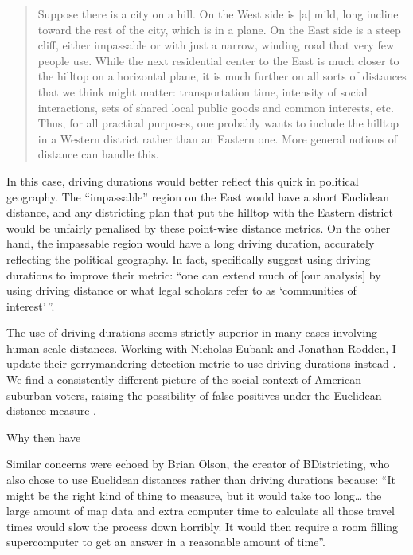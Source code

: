 \documentclass[]{article}
\begin{document}
\begin{quote}
Suppose there is a city on a hill. On the West side is {[}a{]} mild,
long incline toward the rest of the city, which is in a plane. On the
East side is a steep cliff, either impassable or with just a narrow,
winding road that very few people use. While the next residential center
to the East is much closer to the hilltop on a horizontal plane, it is
much further on all sorts of distances that we think might matter:
transportation time, intensity of social interactions, sets of shared
local public goods and common interests, etc. Thus, for all practical
purposes, one probably wants to include the hilltop in a Western
district rather than an Eastern one. More general notions of distance
can handle this.
\end{quote}

In this case, driving durations would better reflect this quirk in
political geography. The ``impassable'' region on the East would have a
short Euclidean distance, and any districting plan that put the hilltop
with the Eastern district would be unfairly penalised by these
point-wise distance metrics. On the other hand, the impassable region
would have a long driving duration, accurately reflecting the political
geography. In fact, \citeauthor{fh2011} specifically suggest using
driving durations to improve their metric: ``one can extend much of
{[}our analysis{]} by using driving distance or what legal scholars
refer to as `communities of interest'\,''.

The use of driving durations seems strictly superior in many cases
involving human-scale distances. Working with Nicholas Eubank and
Jonathan Rodden, I update their gerrymandering-detection metric to use
driving durations instead \citep{er2019}. We find a consistently
different picture of the social context of American suburban voters,
raising the possibility of false positives under the Euclidean distance
measure \citep*{elrwp}.

Why then have

Similar concerns were echoed by Brian Olson, the creator of
BDistricting, who also chose to use Euclidean distances rather than
driving durations because: ``It might be the right kind of thing to
measure, but it would take too long\ldots{} the large amount of map data
and extra computer time to calculate all those travel times would slow
the process down horribly. It would then require a room filling
supercomputer to get an answer in a reasonable amount of time''.
\end{document}
